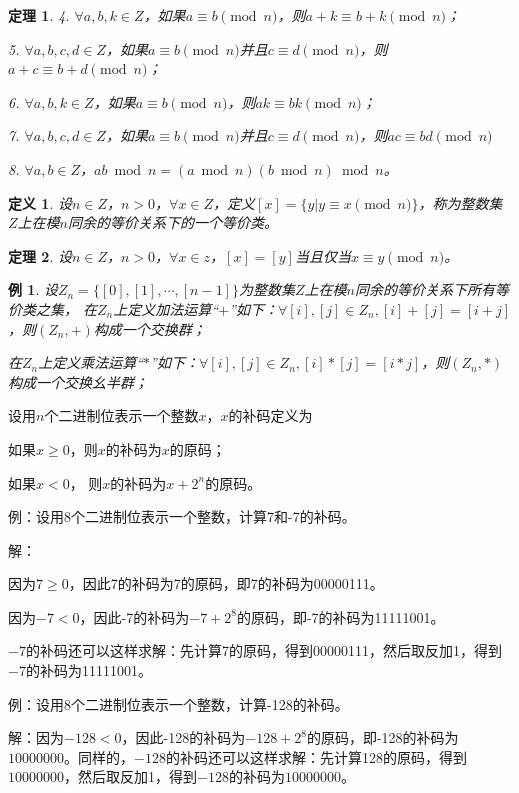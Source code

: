 \documentclass{article}
\newtheorem{Def}{定义}
\newtheorem{Thm}{定理}
\newtheorem*{Example}{例}
\begin{document}
\begin{CJK*}{UTF8}{gbsn}
\begin{Thm}
  4. $\forall a,b,k\in Z$，如果$a\equiv b\pmod{n}$，则$a+k\equiv b+k\pmod{n}$；

  5. $\forall a,b,c,d\in Z$，如果$a\equiv b\pmod{n}$并且$c\equiv d\pmod{n}$，则$a+c\equiv b+d \pmod{n}$；

  6. $\forall a,b,k\in Z$，如果$a\equiv b\pmod{n}$，则$ak\equiv bk\pmod{n}$；

  7. $\forall a,b,c,d\in Z$，如果$a\equiv b\pmod{n}$并且$c\equiv d\pmod{n}$，则$ac\equiv bd \pmod{n}$

  8. $\forall a,b\in Z$，$ab \bmod n=(a\bmod n)(b\bmod n) \bmod n$。
\end{Thm}

\begin{Def}
  设$n\in Z$，$n>0$，$\forall x\in Z$，定义$[x]=\{y|y\equiv x \pmod{n}\}$，称为整数集$Z$上在模$n$同余的等价关系下的一个等价类。
\end{Def}
\begin{Thm}
  设$n\in Z$，$n>0$，$\forall x\in z$，$[x]=[y]$当且仅当$x\equiv y\pmod{n}$。
\end{Thm}

\begin{Example}
  设$Z_n=\{[0],[1],\cdots,[n-1]\}$为整数集$Z$上在模$n$同余的等价关系下所有等价类之集，
  在$Z_n$上定义加法运算“$+$”如下：$\forall [i],[j]\in Z_n,[i]+[j]=[i+j]$，则$(Z_n,+)$构成一个交换群；

  在$Z_n$上定义乘法运算“$*$”如下：$\forall [i],[j]\in Z_n,[i]*[j]=[i*j]$，则$(Z_n,*)$构成一个交换幺半群；
\end{Example}


设用$n$个二进制位表示一个整数$x$，$x$的补码定义为

如果$x\geq 0$，则$x$的补码为$x$的原码；

如果$x < 0$， 则$x$的补码为$x+2^n$的原码。

例：设用8个二进制位表示一个整数，计算7和-7的补码。

解：

因为$7\geq 0$，因此7的补码为7的原码，即7的补码为00000111。

因为$-7 < 0$，因此-7的补码为$-7+2^8$的原码，即-7的补码为11111001。

$-7$的补码还可以这样求解：先计算7的原码，得到00000111，然后取反加1，得到$-7$的补码为11111001。

例：设用8个二进制位表示一个整数，计算-128的补码。

解：因为$-128 < 0$，因此-128的补码为$-128+2^8$的原码，即-128的补码为$10000000$。同样的，$-128$的补码还可以这样求解：先计算128的原码，得到$10000000$，然后取反加1，得到$-128$的补码为$10000000$。


\end{CJK*}
\end{document}
